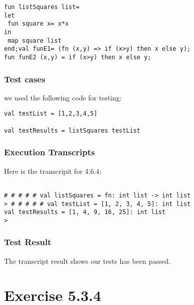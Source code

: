 \documentclass{report}
\begin{document}
\lstset{frameround=tttt}
\begin{lstlisting}[frame=TRBL]
fun listSquares list=
let
 fun square x= x*x
in
 map square list
end;val funE1= (fn (x,y) => if (x>y) then x else y);
fun funE2 (x,y) = if (x>y) then x else y;
\end{lstlisting}

\subsection{Test cases}
\label{sec:test-cases-2}

we used the following code for testing:
\lstset{frameround=tttt}
\begin{lstlisting}[frame=TRBL]
val testList = [1,2,3,4,5]

val testResults = listSquares testList
\end{lstlisting}

\subsection{Execution Transcripts}
\label{sec:exec-transcr-1}
Here is the transcripit for 4.6.4:
\setcounter{sessioncount}{0}
\begin{session}
  \begin{scriptsize}
\begin{verbatim}

# # # # # val listSquares = fn: int list -> int list
> # # # # # val testList = [1, 2, 3, 4, 5]: int list
val testResults = [1, 4, 9, 16, 25]: int list
> 
\end{verbatim}
  \end{scriptsize}
\end{session}

\subsection{Test Result}
\label{sec:test-result-1}

The transcript result shows our tests has been passed.
\chapter{Exercise 5.3.4}
\label{cha:exercise-5.3.4}
\end{document}
